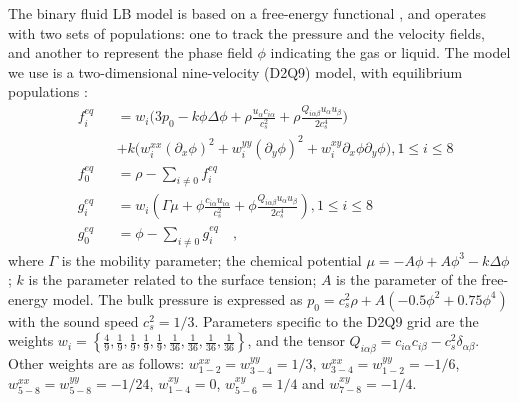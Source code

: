 \documentclass{article}
\begin{document}
The binary fluid LB model is based on a free-energy functional \cite{swift,landau}, and operates with two sets of populations: one to track the pressure and the velocity fields, and another to represent the phase field $\phi$ indicating the gas or liquid. The model we use is a two-dimensional nine-velocity (D2Q9) model, with equilibrium populations \cite{pooley-contact}:
\begin{equation}
\label{set:equilibrium:binary}
\begin{aligned}
&f_i^{eq}&&=w_i 
\biggl(3
p_0 - k \phi \Delta \phi
+\rho\frac{u_{\alpha}c_{i\alpha}}{c_s^2}+\rho \frac{Q_{i\alpha\beta}u_{\alpha } u_ {
\beta}}{2 c_s^4}\biggr)\\
&&&+k\bigl(w_i^{xx} (\partial_x \phi)^2+w_i^{yy} (\partial_y \phi)^2 +w_i^{xy} \partial_x
\phi \partial_y \phi \bigr), 1\leq i \leq 8\\
&f_0^{eq}&&=\rho-\sum_{i\neq0}{f_i^{eq}}\\
&g_i^{eq}&&=w_i\left(\Gamma \mu + \phi\frac{ c_{i\alpha} u_{i\alpha}}{c_s^2}+\phi
\frac{Q_{i\alpha\beta}u_{\alpha}u_{\beta}}{2 c_s^4}\right), 1\leq i \leq 8 \\
&g_0^{eq}&&=\phi-\sum_{i\neq0}{g_i^{eq}}\quad,
\end{aligned}
\end{equation}
where $\Gamma$ is the mobility parameter; the chemical potential
$\mu=-A\phi+A\phi^3-k\Delta\phi$; $k$ is the parameter related to the surface tension; $A$ is the parameter of the free-energy model. The bulk pressure is expressed as $p_0=c_s^2 \rho +A (-0.5 \phi^2+0.75 \phi^4)$ with the sound speed $c_s^2=1/3$. 
Parameters specific to the D2Q9 grid are the weights $w_i=\left\{\frac{4}{9},\frac{1}{9},\frac{1}{9},\frac{1}{9},\frac{1}{9},
\frac{1}{36},\frac{1}{36},\frac{1}{36},\frac{1}{36}\right\}$, and the tensor
$Q_{i\alpha\beta}=c_{i\alpha} c_{i\beta} - c_s^2 \delta_{\alpha\beta}$.  
Other weights are as follows:
$w^{xx}_{1-2}=w^{yy}_{3-4}=1/3$, $w^{xx}_{3-4}=w^{yy}_{1-2}=-1/6$,
$w^{xx}_{5-8}=w^{yy}_{5-8}=-1/24$, $w^{xy}_{1-4}=0$, $w^{xy}_{5-6}=1/4$ and
$w^{xy}_{7-8}=-1/4$. 
\end{document}
